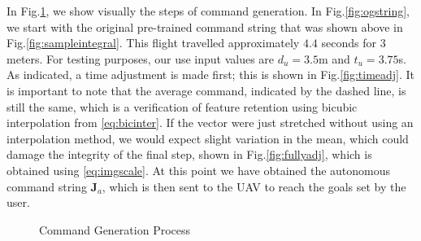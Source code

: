 \documentclass[letterpaper, 10 pt, conference]{ieeeconf}  %
\begin{document}
In Fig.\ref{fig:gensample}, we show visually the steps of command generation. In Fig.\ref{fig:ogstring}, we start with the original pre-trained command string that was shown above in Fig.\ref{fig:sampleintegral}. This flight travelled approximately $4.4$ seconds for $3$ meters. For testing purposes, our use input values are $d_u=3.5$m and $t_u=3.75$s. As indicated, a time adjustment is made first; this is shown in Fig.\ref{fig:timeadj}. It is important to note that the average command, indicated by the dashed line, is still the same, which is a verification of feature retention using bicubic interpolation from \eqref{eq:bicinter}. If the vector were just stretched without using an interpolation method, we would expect slight variation in the mean, which could damage the integrity of the final step, shown in Fig.\ref{fig:fullyadj}, which is obtained using \eqref{eq:imgscale}. At this point we have obtained the autonomous command string $\mathbf{J}_a$, which is then sent to the UAV to reach the goals set by the user.


\begin{figure}[h]
	\centering
	\caption{Command Generation Process}
	\label{fig:gensample}
\end{figure}
\end{document}
